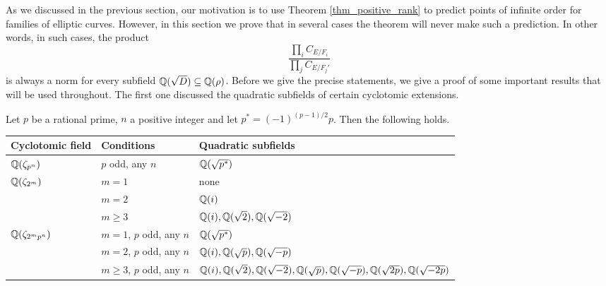 As we discussed in the previous section, our motivation is to use Theorem \ref*{thm_positive_rank} to predict points of infinite order for families of elliptic curves. However, in this section we prove that in several cases the theorem will never make such a prediction. In other words, in such cases, the product 
$$\frac{\prod_i C_{E/F_i}}{\prod_j C_{E/F_j'}}$$ 
is always a norm for every subfield $\mathbb{Q}(\sqrt{D})\subseteq\mathbb{Q}(\rho)$. Before we give the precise statements, we give a proof of some important results that will be used throughout. The first one discussed the quadratic subfields of certain cyclotomic extensions.

\begin{lemma}\label{lem_subfields}
    Let $p$ be a rational prime, $n$ a positive integer and let $p^*=(-1)^{(p-1)/2}p$. Then the following holds.

    \begin{table}[!ht]
        \centering
        \begin{tabular}{|l|l|l|}
        \hline
        Cyclotomic field                     & Conditions & Quadratic subfields                   \\ \hline
        $\mathbb{Q}(\zeta_{p^n})$                   & $p$ odd, any $n$    & $\mathbb{Q}(\sqrt{p^*})$                            \\ \hline
        \multirow{3}{*}{$\mathbb{Q}(\zeta_{2^m})$}  & $m=1$      & none                                  \\ \cline{2-3} 
                                             & $m=2$      & $\mathbb{Q}(i)$                              \\ \cline{2-3} 
                                             & $m\geq3$   & $\mathbb{Q}(i),\mathbb{Q}(\sqrt{2}),\mathbb{Q}(\sqrt{-2})$ \\ \hline
         \multirow{3}{*}{$\mathbb{Q}(\zeta_{2^mp^n})$}  & $m=1$, $p$ odd, any $n$      & $\mathbb{Q}(\sqrt{p^*})$                                  \\ \cline{2-3} 
                                             & $m=2$, $p$ odd, any $n$      & $\mathbb{Q}(i),\mathbb{Q}(\sqrt{p}),\mathbb{Q}(\sqrt{-p})$                              \\ \cline{2-3} 
                                             & $m\geq3$, $p$ odd, any $n$   & {\color{red} $\mathbb{Q}(i),\mathbb{Q}(\sqrt{2}),\mathbb{Q}(\sqrt{-2}),\mathbb{Q}(\sqrt{p}),\mathbb{Q}(\sqrt{-p}),\mathbb{Q}(\sqrt{2p}),\mathbb{Q}(\sqrt{-2p})$} \\ \hline
        \end{tabular}
        \end{table}

\end{lemma}

